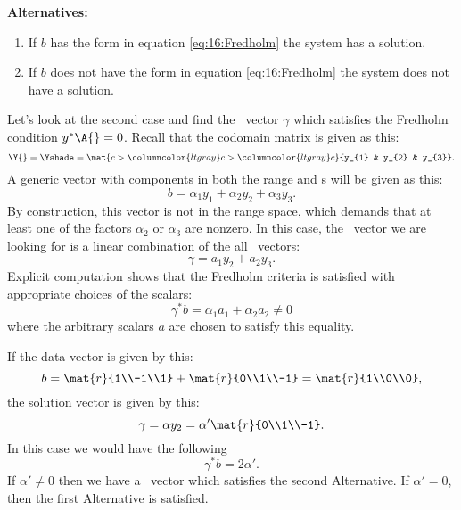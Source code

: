 \textbf{Alternatives:} 
\begin{enumerate}
\item If $b$ has the form in equation \eqref{eq:16:Fredholm} the system has a solution.
\item If $b$ does not have the form in equation \eqref{eq:16:Fredholm} the system does not have a solution.
\end{enumerate}

Let's look at the second case and find the \ns\ vector $\gamma$ which satisfies the Fredholm condition $y^{*}\A{} = 0$. Recall that the codomain matrix is given as this:
\begin{equation}
  \Y{} = \Yshade = \mat{c>{\columncolor{ltgray}}c>{\columncolor{ltgray}}c}{y_{1} & y_{2} & y_{3}}.
\end{equation}
A generic vector with components in both the range and \ns s will be given as this:
\begin{equation}
  b = \alpha_{1} y_{1} + \alpha_{2} y_{2} + \alpha_{3} y_{3}.
\end{equation}
By construction, this vector is not in the range space, which demands that at least one of the factors $\alpha_{2}$ or $\alpha_{3}$ are nonzero. In this case, the \ns\ vector we are looking for is a linear combination of the all \ns\ vectors:
\begin{equation}
  \gamma = a_{1} y_{2} + a_{2} y_{3}.
\end{equation}
Explicit computation shows that the Fredholm criteria is satisfied with appropriate choices of the scalars:
\begin{equation}
  \gamma^{*} b = \alpha_{1} a_{1} + \alpha_{2} a_{2} \ne 0
\end{equation}
where the arbitrary scalars $a$ are chosen to satisfy this equality.

If the data vector is given by this:
\begin{equation}
  b = \mat{r}{1\\-1\\1} + \mat{r}{0\\1\\-1} = \mat{r}{1\\0\\0},
\end{equation}
the solution vector is given by this:
\begin{equation}
  \gamma = \alpha y_{2} = \alpha' \mat{r}{0\\1\\-1}.
\end{equation}
In this case we would have the following
\begin{equation}
  \gamma^{*} b = 2\alpha'.
\end{equation}
If $\alpha'\ne0$ then we have a \ns\ vector which satisfies the second Alternative. If $\alpha'=0$, then the first Alternative is satisfied.


\endinput